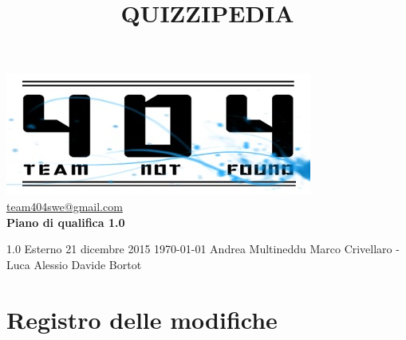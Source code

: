 \documentclass[a4paper,11pt]{article}
\title{\textbf{{\fontsize{8mm}{5mm}\selectfont QUIZZIPEDIA}}}
\date{}
\author{}
\begin{document}
	\maketitle
	\thispagestyle{empty}
	\begin{center}	
	\includegraphics{../team_not_found.jpg}\\
	\fontsize{5mm}{3mm}\url{team404swe@gmail.com}\\
	
	\vspace{50mm}
	\textbf{Piano di qualifica 1.0}
	\end{center}
			{1.0} 							%
			{Esterno} 						%
			{21 dicembre 2015} 				%
			{\today} 						%
			{Andrea Multineddu}	%
			{Marco Crivellaro - Luca Alessio } 			%
			{Davide Bortot } 				%
	\newpage
	\thispagestyle{empty}
	\null  %

	\newpage
	\newpage
	\fancyfoot[R]{\thepage}
	
	\hspace{30 mm}
	\section*{Registro delle modifiche}
	
\end{document}
